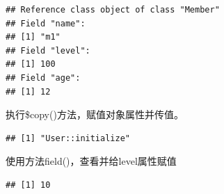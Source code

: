 \documentclass[]{book}
\newenvironment{Shaded}{\begin{snugshade}}{\end{snugshade}}
\newcommand{\KeywordTok}[1]{\textcolor[rgb]{0.13,0.29,0.53}{\textbf{#1}}}
\newcommand{\DataTypeTok}[1]{\textcolor[rgb]{0.13,0.29,0.53}{#1}}
\newcommand{\DecValTok}[1]{\textcolor[rgb]{0.00,0.00,0.81}{#1}}
\newcommand{\StringTok}[1]{\textcolor[rgb]{0.31,0.60,0.02}{#1}}
\newcommand{\CommentTok}[1]{\textcolor[rgb]{0.56,0.35,0.01}{\textit{#1}}}
\newcommand{\OperatorTok}[1]{\textcolor[rgb]{0.81,0.36,0.00}{\textbf{#1}}}
\newcommand{\NormalTok}[1]{#1}
\begin{document}
\begin{Shaded}
\end{Shaded}

\begin{verbatim}
## Reference class object of class "Member"
## Field "name":
## [1] "m1"
## Field "level":
## [1] 100
## Field "age":
## [1] 12
\end{verbatim}

执行\$copy()方法，赋值对象属性并传值。

\begin{Shaded}
\end{Shaded}

\begin{verbatim}
## [1] "User::initialize"
\end{verbatim}

使用方法field()，查看并给level属性赋值

\begin{Shaded}
\end{Shaded}

\begin{verbatim}
## [1] 10
\end{verbatim}

\begin{Shaded}
\end{Shaded}
\end{document}
